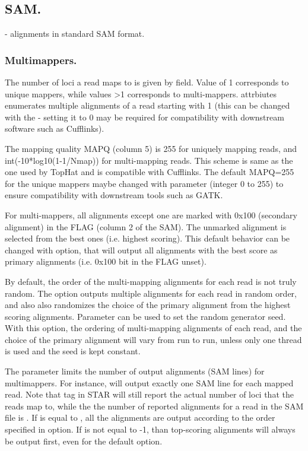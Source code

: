 \documentclass[12pt]{article}
\begin{document}
\subsection{SAM.}
 - alignments in standard SAM format.
\subsubsection{Multimappers.}
The number of loci  a read maps to is given by   field. Value of 1 corresponds to unique mappers, while values \textgreater1 corresponds to multi-mappers.  attrbiutes enumerates multiple alignments of a read starting with 1 (this can be changed with the  - setting it to 0 may be required for compatibility with downstream software such as Cufflinks).

The mapping quality MAPQ (column 5) is 255 for uniquely mapping reads, and int(-10*log10(1-1/Nmap))  for multi-mapping reads. This scheme is same as the one used by TopHat and is compatible with Cufflinks. The default MAPQ=255 for the unique mappers maybe changed with   parameter (integer 0 to 255) to ensure compatibility with downstream tools such as GATK.

For multi-mappers, all alignments except one are marked with 0x100 (secondary alignment) in the FLAG (column 2 of the SAM). The unmarked alignment is selected from the best ones (i.e. highest scoring). This default behavior can be changed with   option, that will output all alignments with the best score as primary alignments (i.e. 0x100 bit in the FLAG unset).

By default, the order of the multi-mapping alignments for each read is not truly random.
The   option outputs multiple alignments for each read in random order, and also also randomizes the choice of the primary alignment from the highest scoring alignments. Parameter  can be used to set the random generator seed. With this option, the ordering of multi-mapping alignments of each read, and the choice of the primary alignment will vary from run to run, unless only one thread is used and the seed is kept constant.

The  parameter limits the number of output alignments (SAM lines) for multimappers. For instance,   will output exactly one SAM line for each mapped read. Note that  tag in STAR will still report the actual number of loci that the reads map to, while the the number of reported alignments for a read in the SAM file is . If  is equal to , all the alignments are output according to the order specified in  option. If  is not equal to -1, than top-scoring alignments will always be output first, even for the default   option.
\end{document}
